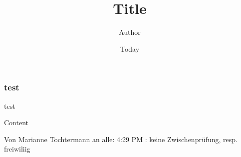 \documentclass[]{article}
\begin{document}
\title{Title}
\author{Author}
\date{Today}
\maketitle

\begin{frame}
\frametitle{test}
test
\end{frame}


Content

Von Marianne Tochtermann an alle:    4:29  PM
: keine Zwischenprüfung, resp. freiwiliig
\end{document}
